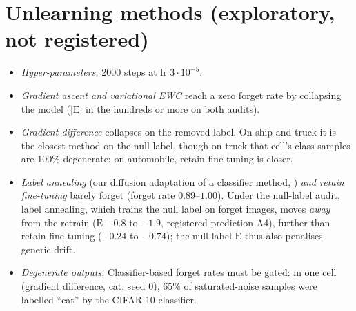 \documentclass[10pt]{article}
\newcommand{\E}{\mathrm{E}}
\begin{document}
\section{Unlearning methods (exploratory, not registered)}\label{app:methods}
\begin{itemize}
\item \emph{Hyper-parameters.} 2000 steps at lr $3\cdot10^{-5}$.
\item \emph{Gradient ascent and variational EWC} reach a zero forget rate by collapsing the model ($|\E|$ in the hundreds or more on both audits).
\item \emph{Gradient difference} collapses on the removed label. On ship and truck it is the closest method on the null label, though on truck that cell's class samples are 100\% degenerate; on automobile, retain fine-tuning is closer.
\item \emph{Label annealing} (our diffusion adaptation of a classifier method, \citealp{panda2025}) \emph{and retain fine-tuning} barely forget (forget rate $0.89$--$1.00$). Under the null-label audit, label annealing, which trains the null label on forget images, moves \emph{away} from the retrain ($\E$ $-0.8$ to $-1.9$, registered prediction A4), further than retain fine-tuning ($-0.24$ to $-0.74$); the null-label $\E$ thus also penalises generic drift.
\item \emph{Degenerate outputs.} Classifier-based forget rates must be gated: in one cell (gradient difference, cat, seed 0), 65\% of saturated-noise samples were labelled ``cat'' by the CIFAR-10 classifier.
\end{itemize}
\end{document}
